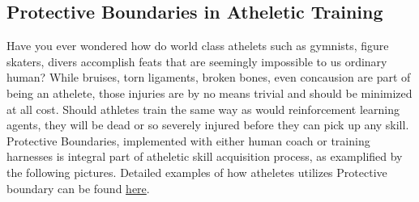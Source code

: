\documentclass[journal]{IEEEtran}
\begin{document}
\subsection{Protective Boundaries in Atheletic Training}
Have you ever wondered how do world class athelets such as gymnists, figure skaters, divers accomplish feats that are seemingly impossible to us ordinary human?  While bruises, torn ligaments, broken bones, even concausion are part of being an athelete, those injuries are by no means trivial and should be minimized at all cost. Should athletes train the same way as would reinforcement learning agents, they will be dead or so severely injured before they can pick up any skill. Protective Boundaries, implemented with either human coach or training harnesses is integral part of atheletic skill acquisition process, as examplified by the following pictures. Detailed examples of how atheletes utilizes Protective boundary can be found \href{https://www.youtube.com/playlist?list=PLyqL4-20ZuTRo-DysDQBGDnwZsrySXP4b}{here}.
\end{document}
